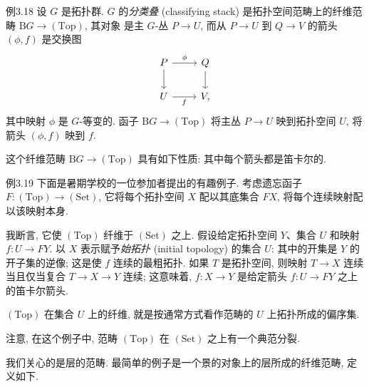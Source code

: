 \begin{origstatement}{例}{3.18}\label{ch03:ex318}
设 $G$ 是拓扑群. $G$ 的\emph{分类叠} (classifying stack) 是拓扑空间范畴上的纤维范畴 $\mathrm BG\to(\mathrm{Top})$, 其对象
是主 $G$-丛 $P\to U$, 而从 $P\to U$ 到 $Q\to V$ 的箭头 $(\phi,f)$ 是交换图
\[
\begin{tikzcd}
P\arrow[r,"{\phi}"]\arrow[d]&Q\arrow[d]\\
U\arrow[r,"{f}"']&V,
\end{tikzcd}
\]
其中映射 $\phi$ 是 $G$-等变的. 函子 $\mathrm BG\to(\mathrm{Top})$ 将主丛 $P\to U$ 映到拓扑空间 $U$, 将箭头 $(\phi,f)$ 映到 $f$.

这个纤维范畴 $\mathrm BG\to(\mathrm{Top})$ 具有如下性质: 其中每个箭头都是笛卡尔的.
\end{origstatement}

\begin{origstatement}{例}{3.19}\label{ch03:ex319}
下面是暑期学校的一位参加者提出的有趣例子. 考虑遗忘函子 $F:(\mathrm{Top})\to(\mathrm{Set})$, 它将每个拓扑空间 $X$ 配以其底集合 $FX$, 将每个连续映射配以该映射本身.

我断言, 它使 $(\mathrm{Top})$ 纤维于 $(\mathrm{Set})$ 之上. 假设给定拓扑空间 $Y$、集合 $U$ 和映射 $f:U\to FY$. 以 $X$ 表示赋予\emph{始拓扑} (initial topology) 的集合 $U$: 其中的开集是 $Y$ 的开子集的逆像; 这是使 $f$ 连续的最粗拓扑. 如果 $T$ 是拓扑空间, 则映射 $T\to X$ 连续当且仅当复合 $T\to X\to Y$ 连续; 这意味着, $f:X\to Y$ 是给定箭头 $f:U\to FY$ 之上的笛卡尔箭头.

$(\mathrm{Top})$ 在集合 $U$ 上的纤维, 就是按通常方式看作范畴的 $U$ 上拓扑所成的偏序集.

注意, 在这个例子中, 范畴 $(\mathrm{Top})$ 在 $(\mathrm{Set})$ 之上有一个典范分裂.
\end{origstatement}

我们关心的是层的范畴. 最简单的例子是一个景的对象上的层所成的纤维范畴, 定义如下.


